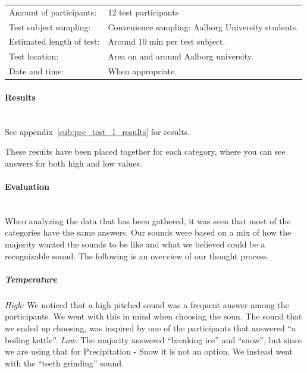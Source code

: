\begin{tabular}{l l}
Amount of participants: & 12 test participants \\
Test subject sampling: & Convenience sampling: Aalborg University students. \\
Estimated length of test: & Around 10 min per test subject. \\
Test location: & Area on and around Aalborg university. \\
Date and time: & When appropriate.
\end{tabular}


\paragraph{Results} %
\label{par:results}
\hspace{0pt} \\
See appendix~\ref{sub:pre_test_1_results} for results.

These results have been placed together for each category, where you can see answers for both high and low values. 


\paragraph{Evaluation} %
\label{par:evaluation}
\hspace{0pt} \\
When analyzing the data that has been gathered, it was seen that most of the categories have the same answers. 
Our sounds were based on a mix of how the majority wanted the sounds to be like and what we believed could be a recognizable sound. 
The following is an overview of our thought process. 

\subparagraph{Temperature} %
\label{subp:temperature}
\emph{High:} We noticed that a high pitched sound was a frequent answer among the participants. We went with this in mind when choosing the soun. 
The sound that we ended up choosing, was inspired by one of the participants that answered \enquote{a boiling kettle}. \newline
\emph{Low:} The majority answered \enquote{breaking ice} and \enquote{snow}, but since we are using that for Precipitation - Snow it is not an option. 
We instead went with the \enquote{teeth grinding} sound.

